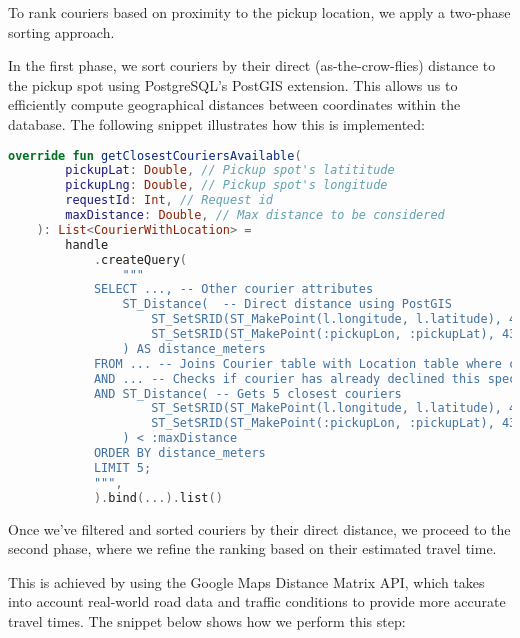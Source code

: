 To rank couriers based on proximity to the pickup location, we apply a two-phase sorting approach.

In the first phase, we sort couriers by their direct (as-the-crow-flies) distance to the pickup spot using PostgreSQL's PostGIS extension. This allows us to efficiently compute geographical distances between coordinates within the database. The following snippet illustrates how this is implemented:

\begin{lstlisting}[language=Kotlin, caption={Ranking couriers by direct distance using PostgreSQL PostGIS extension}]
override fun getClosestCouriersAvailable(
        pickupLat: Double, // Pickup spot's latititude
        pickupLng: Double, // Pickup spot's longitude
        requestId: Int, // Request id
        maxDistance: Double, // Max distance to be considered
    ): List<CourierWithLocation> =
        handle
            .createQuery(
                """
            SELECT ..., -- Other courier attributes
                ST_Distance(  -- Direct distance using PostGIS
                    ST_SetSRID(ST_MakePoint(l.longitude, l.latitude), 4326)::geography,
                    ST_SetSRID(ST_MakePoint(:pickupLon, :pickupLat), 4326)::geography
                ) AS distance_meters
            FROM ... -- Joins Courier table with Location table where courier is available
            AND ... -- Checks if courier has already declined this specific request
            AND ST_Distance( -- Gets 5 closest couriers
                    ST_SetSRID(ST_MakePoint(l.longitude, l.latitude), 4326)::geography,
                    ST_SetSRID(ST_MakePoint(:pickupLon, :pickupLat), 4326)::geography
                ) < :maxDistance
            ORDER BY distance_meters
            LIMIT 5;
            """,
            ).bind(...).list()
\end{lstlisting}

\noindent Once we've filtered and sorted couriers by their direct distance, we proceed to the second phase, where we refine the ranking based on their estimated travel time.

This is achieved by using the Google Maps Distance Matrix API, which takes into account real-world road data and traffic conditions to provide more accurate travel times. The snippet below shows how we perform this step:

